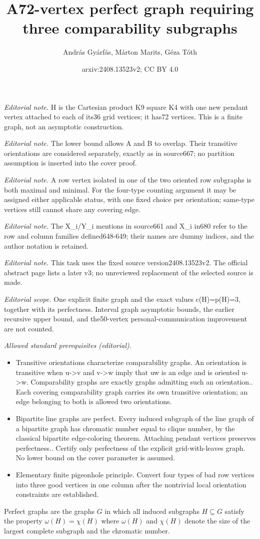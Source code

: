 \documentclass[10pt,a4paper]{article}
\title{A72-vertex perfect graph requiring three comparability subgraphs}
\author{András Gyárfás, Márton Marits, Géza Tóth}
\date{arxiv:2408.13523v2; CC BY 4.0}
\begin{document}
\maketitle
\noindent\textit{Editorial note.} H is the Cartesian product K9 square K4 with one new pendant vertex attached to each of its36 grid vertices; it has72 vertices. This is a finite graph, not an asymptotic construction.\par\medskip
\noindent\textit{Editorial note.} The lower bound allows A and B to overlap. Their transitive orientations are considered separately, exactly as in source667; no partition assumption is inserted into the cover proof.\par\medskip
\noindent\textit{Editorial note.} A row vertex isolated in one of the two oriented row subgraphs is both maximal and minimal. For the four-type counting argument it may be assigned either applicable status, with one fixed choice per orientation; same-type vertices still cannot share any covering edge.\par\medskip
\noindent\textit{Editorial note.} The X\_i/Y\_i mentions in source661 and X\_i in680 refer to the row and column families defined648-649; their names are dummy indices, and the author notation is retained.\par\medskip
\noindent\textit{Editorial note.} This task uses the fixed source version2408.13523v2. The official abstract page lists a later v3; no unreviewed replacement of the selected source is made.\par\medskip
\noindent\textit{Editorial scope.} One explicit finite graph and the exact values c(H)=p(H)=3, together with its perfectness. Interval graph asymptotic bounds, the earlier recursive upper bound, and the50-vertex personal-communication improvement are not counted.\par\medskip
\noindent\textit{Allowed standard prerequisites (editorial).}\begin{itemize}
\item Transitive orientations characterize comparability graphs. An orientation is transitive when u->v and v->w imply that uw is an edge and is oriented u->w. Comparability graphs are exactly graphs admitting such an orientation.. Each covering comparability graph carries its own transitive orientation; an edge belonging to both is allowed two orientations.
\item Bipartite line graphs are perfect. Every induced subgraph of the line graph of a bipartite graph has chromatic number equal to clique number, by the classical bipartite edge-coloring theorem. Attaching pendant vertices preserves perfectness.. Certify only perfectness of the explicit grid-with-leaves graph. No lower bound on the cover parameter is assumed.
\item Elementary finite pigeonhole principle. Convert four types of bad row vertices into three good vertices in one column after the nontrivial local orientation constraints are established.
\end{itemize}\medskip
Perfect graphs are the graphs $G$ in which all induced subgraphs $H\subseteq G$
satisfy the property $\omega(H)=\chi(H)$ where $\omega(H)$ and $\chi(H)$ denote
the size of the largest complete subgraph and the chromatic number.
\end{document}
